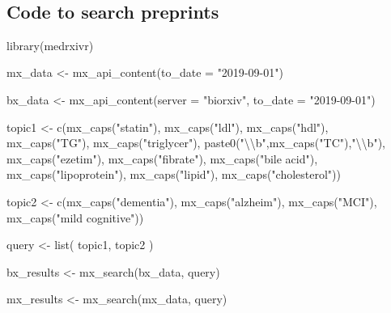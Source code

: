 \documentclass[a4paper, twoside]{templates/ociamthesis}
\newenvironment{Shaded}{\begin{snugshade}}{\end{snugshade}}
\newcommand{\AttributeTok}[1]{\textcolor[rgb]{0.77,0.63,0.00}{#1}}
\newcommand{\FunctionTok}[1]{\textcolor[rgb]{0.00,0.00,0.00}{#1}}
\newcommand{\NormalTok}[1]{#1}
\newcommand{\OtherTok}[1]{\textcolor[rgb]{0.56,0.35,0.01}{#1}}
\newcommand{\SpecialCharTok}[1]{\textcolor[rgb]{0.00,0.00,0.00}{#1}}
\newcommand{\StringTok}[1]{\textcolor[rgb]{0.31,0.60,0.02}{#1}}
\renewenvironment{Shaded}
{
  \vspace{4pt}%
  \begin{snugshade}%
}{%
  \end{snugshade}%
  \vspace{4pt}%
}
\begin{document}
~

\hypertarget{appendix-medrxivr-code}{%
\subsection{Code to search preprints}\label{appendix-medrxivr-code}}

\begin{Shaded}
\begin{Highlighting}[]
\FunctionTok{library}\NormalTok{(medrxivr)}

\NormalTok{mx\_data }\OtherTok{\textless{}{-}} \FunctionTok{mx\_api\_content}\NormalTok{(}\AttributeTok{to\_date =} \StringTok{"2019{-}09{-}01"}\NormalTok{)}

\NormalTok{bx\_data }\OtherTok{\textless{}{-}} \FunctionTok{mx\_api\_content}\NormalTok{(}\AttributeTok{server =} \StringTok{"biorxiv"}\NormalTok{,}
                                    \AttributeTok{to\_date =} \StringTok{"2019{-}09{-}01"}\NormalTok{)}

\NormalTok{topic1 }\OtherTok{\textless{}{-}} \FunctionTok{c}\NormalTok{(}\FunctionTok{mx\_caps}\NormalTok{(}\StringTok{"statin"}\NormalTok{),}
            \FunctionTok{mx\_caps}\NormalTok{(}\StringTok{"ldl"}\NormalTok{),}
            \FunctionTok{mx\_caps}\NormalTok{(}\StringTok{"hdl"}\NormalTok{),}
            \FunctionTok{mx\_caps}\NormalTok{(}\StringTok{"TG"}\NormalTok{),}
            \FunctionTok{mx\_caps}\NormalTok{(}\StringTok{"triglycer"}\NormalTok{),}
            \FunctionTok{paste0}\NormalTok{(}\StringTok{"}\SpecialCharTok{\textbackslash{}\textbackslash{}}\StringTok{b"}\NormalTok{,}\FunctionTok{mx\_caps}\NormalTok{(}\StringTok{"TC"}\NormalTok{),}\StringTok{"}\SpecialCharTok{\textbackslash{}\textbackslash{}}\StringTok{b"}\NormalTok{),}
            \FunctionTok{mx\_caps}\NormalTok{(}\StringTok{"ezetim"}\NormalTok{),}
            \FunctionTok{mx\_caps}\NormalTok{(}\StringTok{"fibrate"}\NormalTok{),}
            \FunctionTok{mx\_caps}\NormalTok{(}\StringTok{"bile acid"}\NormalTok{),}
            \FunctionTok{mx\_caps}\NormalTok{(}\StringTok{"lipoprotein"}\NormalTok{),}
            \FunctionTok{mx\_caps}\NormalTok{(}\StringTok{"lipid"}\NormalTok{),}
            \FunctionTok{mx\_caps}\NormalTok{(}\StringTok{"cholesterol"}\NormalTok{))}

\NormalTok{topic2 }\OtherTok{\textless{}{-}} \FunctionTok{c}\NormalTok{(}\FunctionTok{mx\_caps}\NormalTok{(}\StringTok{"dementia"}\NormalTok{),}
            \FunctionTok{mx\_caps}\NormalTok{(}\StringTok{"alzheim"}\NormalTok{),}
            \FunctionTok{mx\_caps}\NormalTok{(}\StringTok{"MCI"}\NormalTok{),}
            \FunctionTok{mx\_caps}\NormalTok{(}\StringTok{"mild cognitive"}\NormalTok{))}

\NormalTok{query }\OtherTok{\textless{}{-}} \FunctionTok{list}\NormalTok{(}
\NormalTok{  topic1,}
\NormalTok{  topic2}
\NormalTok{)}

\NormalTok{bx\_results }\OtherTok{\textless{}{-}} \FunctionTok{mx\_search}\NormalTok{(bx\_data, query)}


\NormalTok{mx\_results }\OtherTok{\textless{}{-}} \FunctionTok{mx\_search}\NormalTok{(mx\_data, query)}
\end{Highlighting}
\end{Shaded}
\end{document}
